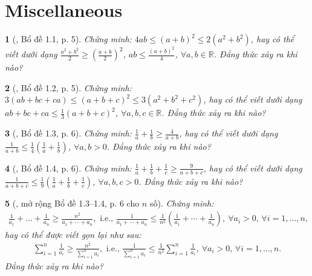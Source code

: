 \documentclass{article}
\newtheorem{baitoan}{}
\begin{document}

\section{Miscellaneous}

\begin{baitoan}[\cite{Son_Nghiep_Trung_Can_bdt}, Bổ đề 1.1, p. 5]
	Chứng minh: $4ab\le(a + b)^2\le2(a^2 + b^2)$, hay có thể viết dưới dạng $\frac{a^2 + b^2}{2}\ge\left(\frac{a + b}{2}\right)^2$, $ab\le\frac{(a + b)^2}{4}$, $\forall a,b\in\mathbb{R}$. Đẳng thức xảy ra khi nào?
\end{baitoan}

\begin{baitoan}[\cite{Son_Nghiep_Trung_Can_bdt}, Bổ đề 1.2, p. 5]
	Chứng minh: $3(ab + bc + ca)\le(a + b + c)^2\le3(a^2 + b^2 + c^2)$, hay có thể viết dưới dạng $ab + bc + ca\le\frac{1}{3}(a + b + c)^2$, $\forall a,b,c\in\mathbb{R}$. Đẳng thức xảy ra khi nào?
\end{baitoan}

\begin{baitoan}[\cite{Son_Nghiep_Trung_Can_bdt}, Bổ đề 1.3, p. 6]
	Chứng minh: $\frac{1}{a} + \frac{1}{b}\ge\frac{4}{a + b}$, hay có thể viết dưới dạng $\frac{1}{a + b}\le\frac{1}{4}\left(\frac{1}{a} + \frac{1}{b}\right)$, $\forall a,b > 0$. Đẳng thức xảy ra khi nào?
\end{baitoan}

\begin{baitoan}[\cite{Son_Nghiep_Trung_Can_bdt}, Bổ đề 1.4, p. 6]
	Chứng minh: $\frac{1}{a} + \frac{1}{b} + \frac{1}{c}\ge\frac{9}{a + b + c}$, hay có thể viết dưới dạng $\frac{1}{a + b + c}\le\frac{1}{9}\left(\frac{1}{a} + \frac{1}{b} + \frac{1}{c}\right)$, $\forall a,b,c > 0$. Đẳng thức xảy ra khi nào?
\end{baitoan}

\begin{baitoan}[\cite{Son_Nghiep_Trung_Can_bdt}, mở rộng Bổ đề 1.3--1.4, p. 6 cho $n$ số]
	Chứng minh:
	\begin{align*}
		\frac{1}{a_1} + \ldots + \frac{1}{a_n}\ge\frac{n^2}{a_1 + \cdots + a_n},\mbox{ i.e., }\frac{1}{a_1 + \cdots + a_n}\le\frac{1}{n^2}\left(\frac{1}{a_1} + \cdots + \frac{1}{a_n}\right),\ \forall a_i > 0,\,\forall i = 1,\ldots,n,
	\end{align*}
	hay có thể được viết gọn lại như sau:
	\begin{align*}
		\sum_{i=1}^{n} \frac{1}{a_i}\ge\frac{n^2}{\sum_{i=1}^n a_i},\mbox{ i.e., }\frac{1}{\sum_{i=1}^n a_i}\le\frac{1}{n^2}\sum_{i=1}^n \frac{1}{a_i},\ \forall a_i > 0,\,\forall i = 1,\ldots,n.
	\end{align*}
	Đẳng thức xảy ra khi nào?
\end{baitoan}
\end{document}
